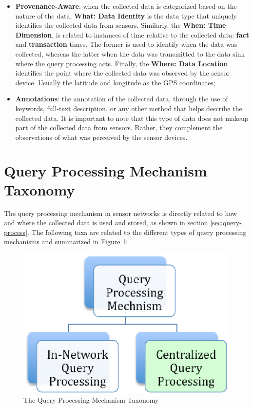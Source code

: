 \begin{itemize}
  \item \textbf{Provenance-Aware}: when the collected data is categorized based
  on the nature of the data, \textbf{What: Data Identity} is the data type
  that uniquely identifies the collected data from sensors. Similarly, the
  \textbf{When: Time Dimension}, is related to instances of time relative to the
  collected data: \textbf{fact} and \textbf{transaction} times. The former is
  used to identify when the data was collected, whereas the latter when the data was
  transmitted to the data sink where the query processing acts. Finally, the
  \textbf{Where: Data Location} identifies the point where the collected data
  was observed by the sensor device. Usually the latitude and longitude as the
  GPS coordinates;
  \item \textbf{Annotations}: the annotation of the collected data, through the
  use of keywords, full-text description, or any other method that helps
  describe the collected data. It is important to note that this type of data
  does not makeup part of the collected data from sensors. Rather, they
  complement the observations of what was perceived by the sensor devices.
\end{itemize}

\section{Query Processing Mechanism Taxonomy}

The query processing mechanism in sensor networks is directly related to how
and where the collected data is used and stored, as shown in section
\ref{sec:query-process}. The following taxa are related to the
different types of query processing mechanisms and summarized in Figure
\ref{fig:taxonomy-query-mechanism}:

\begin{figure}[h]
  \centering
  \includegraphics{../diagrams/taxonomy-query-mechanism}
  \caption{The Query Processing Mechanism Taxonomy}
  \label{fig:taxonomy-query-mechanism}
\end{figure}


